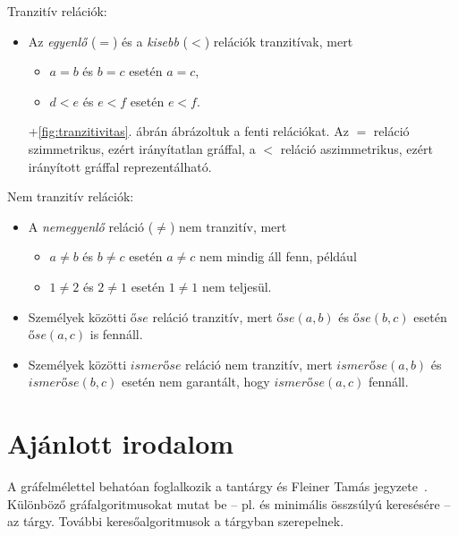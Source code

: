 \begin{pelda}

	Tranzitív relációk:
	\begin{itemize}
	\item Az \emph{egyenlő} ($=$) és a \emph{kisebb} ($<$) relációk tranzitívak, mert
	\begin{itemize}
		\item $a = b$ és $b = c$ esetén $a = c$,
		\item $d < e$ és $e < f$ esetén $e < f$.
	\end{itemize}
	\Az+\ref{fig:tranzitivitas}. ábrán ábrázoltuk a fenti relációkat. Az $=$ reláció szimmetrikus, ezért irányítatlan gráffal, a $<$ reláció aszimmetrikus, ezért irányított gráffal reprezentálható.
	\end{itemize}

	Nem tranzitív relációk:
	\begin{itemize}
	\item A \emph{nemegyenlő} reláció ($\neq$) nem tranzitív, mert
	\begin{itemize}
		\item $a \neq b$ és $b \neq c$ esetén $a \neq c$ nem mindig áll fenn, például
		\item $1 \neq 2$ és $2 \neq 1$ esetén $1 \neq 1$ nem teljesül.
	\end{itemize}
	\item Személyek közötti $\mathit{őse}$ reláció tranzitív, mert $\mathit{őse}(a, b)$ és $\mathit{őse}(b, c)$ esetén $\mathit{őse}(a, c)$ is fennáll.
	\item Személyek közötti $\mathit{ismerőse}$ reláció nem tranzitív, mert $\mathit{ismerőse}(a, b)$ és $\mathit{ismerőse}(b, c)$ esetén nem garantált, hogy $\mathit{ismerőse}(a, c)$ fennáll.
	\end{itemize}
\end{pelda}


\section{Ajánlott irodalom}

A gráfelmélettel behatóan foglalkozik a \bszketto tantárgy és Fleiner Tamás jegyzete~\cite{FleinerJegyzet}. Különböző gráfalgoritmusokat mutat be -- pl.  és minimális összsúlyú  keresésére -- az \algel tárgy. További keresőalgoritmusok a \mestersegesintelligencia tárgyban szerepelnek.

